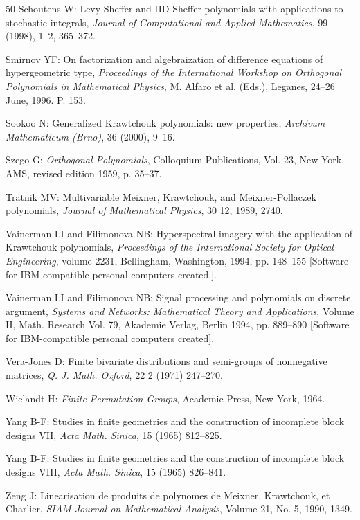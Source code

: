 \begin{thebibliography}{50}
 Schoutens W: Levy-Sheffer and IID-Sheffer polynomials with applications to stochastic integrals, \emph{Journal of Computational and Applied Mathematics}, 99 (1998), 1--2, 365--372.

 Smirnov YF: On factorization and algebraization of difference equations of hypergeometric type, \emph{Proceedings of the International Workshop on Orthogonal Polynomials in Mathematical Physics}, M. Alfaro et al. (Eds.), Leganes, 24--26 June, 1996. P. 153.

 Sookoo N: Generalized Krawtchouk polynomials: new properties, \emph{Archivum Mathematicum (Brno)}, 36 (2000), 9--16.

 Szego G: \emph{Orthogonal Polynomials}, Colloquium Publications, Vol. 23, New York, AMS, revised edition 1959, p. 35--37.

 Tratnik MV: Multivariable Meixner, Krawtchouk, and Meixner-Pollaczek polynomials, \emph{Journal of Mathematical Physics}, 30 12, 1989, 2740.

 Vainerman LI and Filimonova NB: Hyperspectral imagery with the application of Krawtchouk polynomials, \emph{Proceedings of the International Society for Optical Engineering}, volume 2231, Bellingham, Washington, 1994, pp. 148--155 [Software for IBM-compatible personal computers created.].

 Vainerman LI and Filimonova NB: Signal processing and polynomials on discrete argument, \emph{Systems and Networks: Mathematical Theory and Applications}, Volume II, Math. Research Vol. 79, Akademie Verlag, Berlin 1994, pp. 889--890 [Software for IBM-compatible personal computers created].

 Vera-Jones D: Finite bivariate distributions and semi-groups of nonnegative matrices, \emph{Q. J. Math. Oxford}, 22 2 (1971) 247--270.

 Wielandt H: \emph{Finite Permutation Groups}, Academic Press, New York, 1964.

 Yang B-F: Studies in finite geometries and the construction of incomplete block designs VII, \emph{Acta Math. Sinica}, 15 (1965) 812--825.

 Yang B-F: Studies in finite geometries and the construction of incomplete block designs VIII, \emph{Acta Math. Sinica}, 15 (1965) 826--841.

 Zeng J: Linearisation de produits de polynomes de Meixner, Krawtchouk, et Charlier, \emph{SIAM Journal on Mathematical Analysis}, Volume 21, No. 5, 1990, 1349.

\end{thebibliography}

